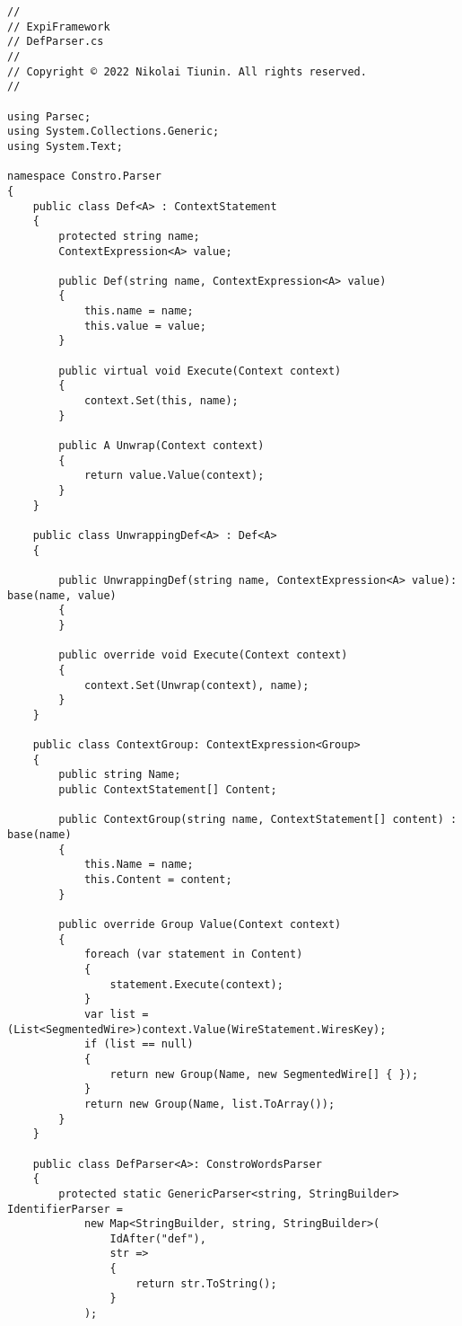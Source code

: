 \documentclass{scrartcl}
\begin{document}
\begin{lstlisting}[language={[Sharp]C}, caption={Def}, label={experiment}]
//
// ExpiFramework
// DefParser.cs
//
// Copyright © 2022 Nikolai Tiunin. All rights reserved.
//

using Parsec;
using System.Collections.Generic;
using System.Text;

namespace Constro.Parser
{
    public class Def<A> : ContextStatement
    {
        protected string name;
        ContextExpression<A> value;

        public Def(string name, ContextExpression<A> value)
        {
            this.name = name;
            this.value = value;
        }

        public virtual void Execute(Context context)
        {
            context.Set(this, name);
        }

        public A Unwrap(Context context)
        {
            return value.Value(context);
        }
    }

    public class UnwrappingDef<A> : Def<A>
    {

        public UnwrappingDef(string name, ContextExpression<A> value): base(name, value)
        {
        }

        public override void Execute(Context context)
        {
            context.Set(Unwrap(context), name);
        }
    }

    public class ContextGroup: ContextExpression<Group>
    {
        public string Name;
        public ContextStatement[] Content;

        public ContextGroup(string name, ContextStatement[] content) : base(name)
        {
            this.Name = name;
            this.Content = content;
        }

        public override Group Value(Context context)
        {
            foreach (var statement in Content)
            {
                statement.Execute(context);
            }
            var list = (List<SegmentedWire>)context.Value(WireStatement.WiresKey);
            if (list == null)
            {
                return new Group(Name, new SegmentedWire[] { });
            }
            return new Group(Name, list.ToArray());
        }
    }

    public class DefParser<A>: ConstroWordsParser
    {
        protected static GenericParser<string, StringBuilder> IdentifierParser =
            new Map<StringBuilder, string, StringBuilder>(
                IdAfter("def"),
                str =>
                {
                    return str.ToString();
                }
            );


\end{lstlisting}
\end{document}
